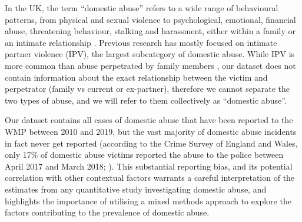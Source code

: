 \documentclass[12pt, a4paper]{article}
\begin{document}
In the UK, the term ``domestic abuse'' refers to a wide range of behavioural patterns, from physical and sexual violence to psychological, emotional, financial abuse, threatening behaviour, stalking and harassment, either within a family or an intimate relationship \cite{ONS}. Previous research has mostly focused on intimate partner violence (IPV), the largest subcategory of domestic abuse. While IPV is more common than abuse perpetrated by family members \cite{ONS}, our dataset does not contain information about the exact relationship between the victim and perpetrator (family vs current or ex-partner), therefore we cannot separate the two types of abuse, and we will refer to them collectively as ``domestic abuse''.


Our dataset contains all cases of domestic abuse that have been reported to the WMP between 2010 and 2019, but the vast majority of domestic abuse incidents in fact never get reported (according to the Crime Survey of England and Wales, only 17\% of domestic abuse victims reported the abuse to the police between April 2017 and March 2018; ). This substantial reporting bias, and its potential correlation with other contextual factors warrants a careful interpretation of the estimates from any quantitative study investigating domestic abuse, and highlights the importance of utilising a mixed methods approach to explore the factors contributing to the prevalence of domestic abuse. 
  
 
 
\end{document}
